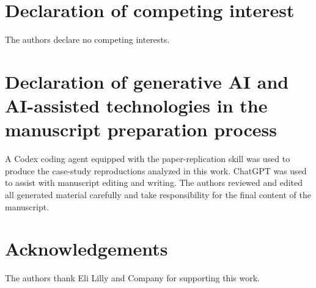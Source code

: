 \documentclass[authoryear,5p,times,nopreprintline]{elsarticle}
\begin{document}
\section*{Declaration of competing interest}
The authors declare no competing interests.

\section*{Declaration of generative AI and AI-assisted technologies in the manuscript preparation process}
A Codex coding agent equipped with the paper-replication skill was used to produce the case-study reproductions analyzed in this work.
ChatGPT was used to assist with manuscript editing and writing.
The authors reviewed and edited all generated material carefully and take responsibility for the final content of the manuscript.

\section*{Acknowledgements}
The authors thank Eli Lilly and Company for supporting this work.



\end{document}
